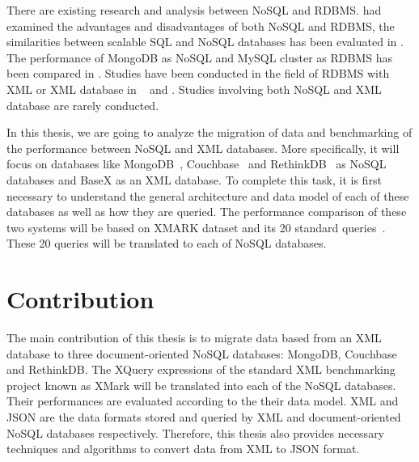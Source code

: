 	\par		
	There are existing research and analysis between NoSQL and RDBMS. \citet{nance2013nosql} had examined the advantages and disadvantages of both NoSQL and RDBMS, the similarities between scalable SQL and NoSQL databases has been evaluated in \cite{cattell2011scalable}. The performance of MongoDB as NoSQL and MySQL cluster as  RDBMS has been compared in   \cite{hadjigeorgiou2013rdbms}.   Studies have been conducted in the field of RDBMS with XML or XML database in  ~\cite{jiang2002xparent} and \cite{shanmugasundaram1999relational}. Studies involving both NoSQL and XML database are rarely conducted.
\par
In this thesis, we are going to analyze the migration of data and benchmarking of the performance between NoSQL and XML databases. More specifically, it will focus on databases like MongoDB~\cite{mongodb:org}, Couchbase~\cite{couchbase} and RethinkDB~\cite{rethinkdb} as NoSQL databases and BaseX as an XML database. To complete this task, it is first necessary to understand the general architecture and data model of each of these databases as well as how they are queried. The performance comparison of these two systems will be based on XMARK dataset and its 20 standard queries~\citep{xmark/original}. These 20 queries will be translated to each of NoSQL databases.
	
	\section{Contribution}
		The main contribution of this thesis is to migrate data based from an XML database to three document-oriented NoSQL databases: MongoDB, Couchbase and RethinkDB. The XQuery expressions of the standard XML benchmarking project known as XMark will be  translated  into each of the NoSQL databases. Their performances are  evaluated according to the their data model. XML and JSON are the data formats stored and queried by XML and document-oriented NoSQL databases respectively. Therefore, this thesis also provides necessary techniques and algorithms to convert data from XML to JSON format.
	    
		
